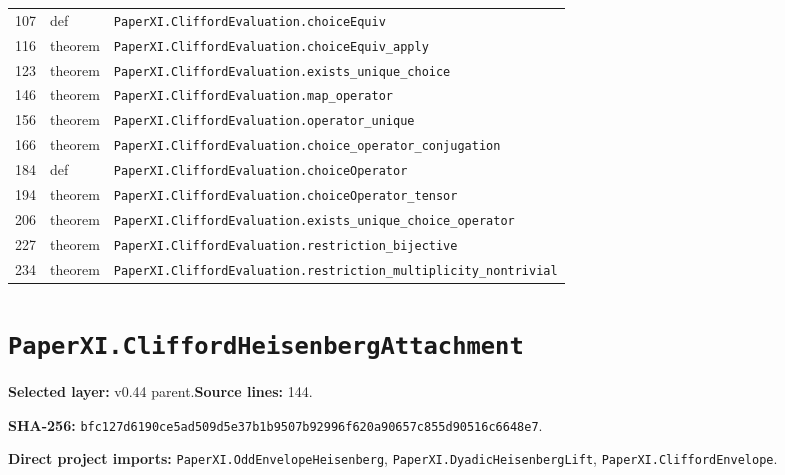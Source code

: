 \documentclass[10pt,oneside]{book}
\begin{document}
\begin{longtable}{@{}p{}p{}p{}@{}}
107&def&\nolinkurl{PaperXI.CliffordEvaluation.choiceEquiv}\\

116&theorem&\nolinkurl{PaperXI.CliffordEvaluation.choiceEquiv_apply}\\

123&theorem&\nolinkurl{PaperXI.CliffordEvaluation.exists_unique_choice}\\

146&theorem&\nolinkurl{PaperXI.CliffordEvaluation.map_operator}\\

156&theorem&\nolinkurl{PaperXI.CliffordEvaluation.operator_unique}\\

166&theorem&\nolinkurl{PaperXI.CliffordEvaluation.choice_operator_conjugation}\\

184&def&\nolinkurl{PaperXI.CliffordEvaluation.choiceOperator}\\

194&theorem&\nolinkurl{PaperXI.CliffordEvaluation.choiceOperator_tensor}\\

206&theorem&\nolinkurl{PaperXI.CliffordEvaluation.exists_unique_choice_operator}\\

227&theorem&\nolinkurl{PaperXI.CliffordEvaluation.restriction_bijective}\\

234&theorem&\nolinkurl{PaperXI.CliffordEvaluation.restriction_multiplicity_nontrivial}\\

\bottomrule\end{longtable}

\section{\texorpdfstring{\nolinkurl{PaperXI.CliffordHeisenbergAttachment}}{PaperXI.CliffordHeisenbergAttachment}}\label{module:PaperXI.CliffordHeisenbergAttachment}

\textbf{Selected layer:} v0.44 parent.\quad\textbf{Source lines:} 144.\par\textbf{SHA-256:} {\scriptsize\nolinkurl{bfc127d6190ce5ad509d5e37b1b9507b92996f620a90657c855d90516c6648e7}}.


\textbf{Direct project imports:} \nolinkurl{PaperXI.OddEnvelopeHeisenberg}, \nolinkurl{PaperXI.DyadicHeisenbergLift}, \nolinkurl{PaperXI.CliffordEnvelope}.
\end{document}
